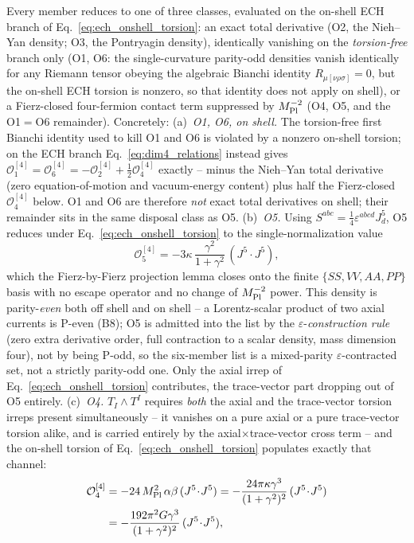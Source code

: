 \documentclass[aps,prd,twocolumn,superscriptaddress,preprintnumbers,nofootinbib,longbibliography,floatfix]{revtex4-2}
\newcommand{\MPl}{M_{\rm Pl}}
\begin{document}
Every member reduces to one of three classes, evaluated on the on-shell
ECH branch of Eq.~\eqref{eq:ech_onshell_torsion}: an exact total
derivative (O2, the Nieh--Yan density; O3, the Pontryagin density),
identically vanishing on the \emph{torsion-free} branch only (O1, O6:
the single-curvature parity-odd densities vanish identically for any
Riemann tensor obeying the algebraic Bianchi identity
$R_{\mu[\nu\rho\sigma]}=0$, but the on-shell ECH torsion is nonzero, so
that identity does not apply on shell), or a Fierz-closed four-fermion
contact term suppressed by $\MPl^{-2}$ (O4, O5, and the O1$=$O6
remainder). Concretely: (a)~\emph{O1, O6, on shell.} The torsion-free
first Bianchi identity used to kill O1 and O6 is violated by a nonzero
on-shell torsion; on the ECH branch Eq.~\eqref{eq:dim4_relations} instead
gives $\mathcal O_1^{[4]}=\mathcal O_6^{[4]}=-\mathcal
O_2^{[4]}+\tfrac12\mathcal O_4^{[4]}$ exactly -- minus the Nieh--Yan
total derivative (zero equation-of-motion and vacuum-energy content)
plus half the Fierz-closed $\mathcal O_4^{[4]}$ below. O1 and O6 are
therefore \emph{not} exact total derivatives on shell; their remainder
sits in the same disposal class as O5. (b)~\emph{O5.} Using
$S^{abc}=\tfrac14\varepsilon^{abcd}J^5_d$, O5 reduces under
Eq.~\eqref{eq:ech_onshell_torsion} to the single-normalization value
\begin{equation}
\mathcal O_5^{[4]}=-3\kappa\,\frac{\gamma^2}{1+\gamma^2}\,(J^5\!\cdot\!J^5),
\end{equation}
which the Fierz-by-Fierz projection lemma closes onto the finite
$\{SS,VV,AA,PP\}$ basis with no escape operator and no change of
$\MPl^{-2}$ power. This density is parity-\emph{even} both off shell and
on shell -- a Lorentz-scalar product of two axial currents is P-even
(B8); O5 is admitted into the list by the $\varepsilon$-\emph{construction
rule} (zero extra derivative order, full contraction to a scalar
density, mass dimension four), not by being P-odd, so the six-member
list is a mixed-parity $\varepsilon$-contracted set, not a strictly
parity-odd one. Only the axial irrep of
Eq.~\eqref{eq:ech_onshell_torsion} contributes, the trace-vector part
dropping out of O5 entirely. (c)~\emph{O4.} $T_I\wedge T^I$ requires
\emph{both} the axial and the trace-vector torsion irreps present
simultaneously -- it vanishes on a pure axial or a pure trace-vector
torsion alike, and is carried entirely by the
axial$\times$trace-vector cross term -- and the on-shell torsion of
Eq.~\eqref{eq:ech_onshell_torsion} populates exactly that channel:
\begin{align}
\mathcal O_4^{[4]}&=-24\,\MPl^2\,\alpha\beta\,(J^5\!\cdot\!J^5)
=-\frac{24\pi\kappa\gamma^3}{(1+\gamma^2)^2}\,(J^5\!\cdot\!J^5)\notag\\
&=-\frac{192\pi^2 G\gamma^3}{(1+\gamma^2)^2}\,(J^5\!\cdot\!J^5),
\end{align}
\end{document}
